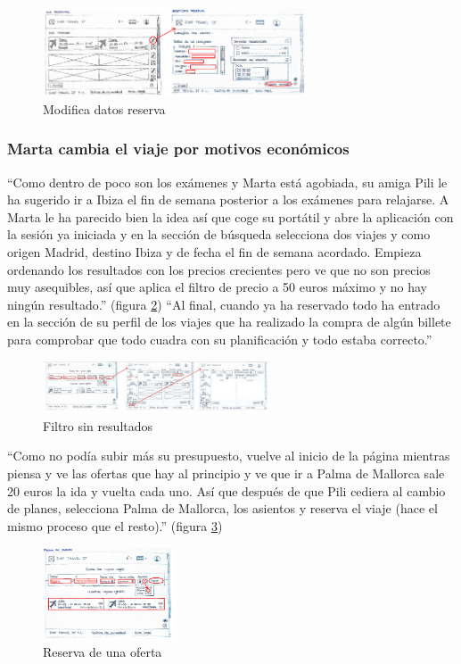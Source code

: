 \begin{figure}[h]
    \centering
    \includegraphics[width=0.7\textwidth]{Imagenes/Keypath/Marta5.png}
    \caption{Modifica datos reserva}
    \label{fig:Marta5}
\end{figure}

\subsubsection{Marta cambia el viaje por motivos económicos}
“Como dentro de poco son los exámenes y Marta está agobiada, su amiga Pili le ha sugerido ir a Ibiza el fin de semana posterior a los exámenes para relajarse. A 
Marta le ha parecido bien la idea así que coge su portátil y abre la aplicación con la sesión ya iniciada y en la sección de búsqueda selecciona dos viajes y 
como origen Madrid, destino Ibiza y de fecha el fin de semana acordado. Empieza ordenando los resultados con los precios crecientes pero ve que no son precios 
muy asequibles, así que aplica el filtro de precio a 50 euros máximo y no hay ningún resultado.” (figura \ref{fig:Marta6}) “Al final, cuando ya ha reservado todo ha entrado en la sección 
de su perfil de los viajes que ha realizado la compra de algún billete para comprobar que todo cuadra con su planificación y todo estaba correcto.”
\begin{figure}[h]
    \centering
    \includegraphics[width=0.6\textwidth]{Imagenes/Keypath/Marta6.png}
    \caption{Filtro sin resultados}
    \label{fig:Marta6}
\end{figure}

“Como no podía subir más su presupuesto, vuelve al inicio de la página mientras piensa y ve las ofertas que hay al principio y ve que ir a Palma de Mallorca sale 
20 euros la ida y vuelta cada uno. Así que después de que Pili cediera al cambio de planes, selecciona Palma de Mallorca, los asientos y reserva el viaje 
(hace el mismo proceso que el resto).” (figura \ref{fig:Marta7})
\begin{figure}[h]
    \centering
    \includegraphics[width=0.35\textwidth]{Imagenes/Keypath/Marta7.png}
    \caption{Reserva de una oferta}
    \label{fig:Marta7}
\end{figure}
